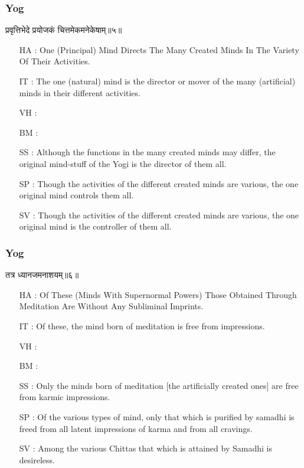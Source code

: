 \begin{frame}[fragile]\frametitle{Yog}
\begin{sanskrit}
प्रवृत्तिभेदे प्रयोजकं चित्तमेकमनेकेषाम्॥५॥
\end{sanskrit}

	\begin{itemize}
	\item [HA]: One (Principal) Mind Directs The Many Created Minds In The Variety Of Their Activities.
	\item [IT]: The one (natural) mind is the director or mover of the many (artificial) minds in their different activities.
	\item [VH]: 
	\item [BM]: 
	\item [SS]: Although the functions in the many created minds may differ, the original mind-stuff of the Yogi is the director of them all.
	\item [SP]: Though the activities of the different created minds are various, the one original mind controls them all.
	\item [SV]: Though the activities of the different created minds are various, the one original mind is the controller of them all. 
	\end{itemize}
\end{frame}


\begin{frame}[fragile]\frametitle{Yog}
\begin{sanskrit}
तत्र ध्यानजमनाशयम्॥६॥
\end{sanskrit}

	\begin{itemize}
	\item [HA]: Of These (Minds With Supernormal Powers) Those Obtained Through Meditation Are Without Any Subliminal Imprints.
	\item [IT]: Of these, the mind born of meditation is free from impressions.
	\item [VH]: 
	\item [BM]: 
	\item [SS]: Only the minds born of meditation [the artificially created ones] are free from karmic impressions.
	\item [SP]: Of the various types of mind, only that which is purified by samadhi is freed from all latent impressions of karma and from all cravings.
	\item [SV]: Among the various Chittas that which is attained by Samadhi is desireless. 
	\end{itemize}
\end{frame}



